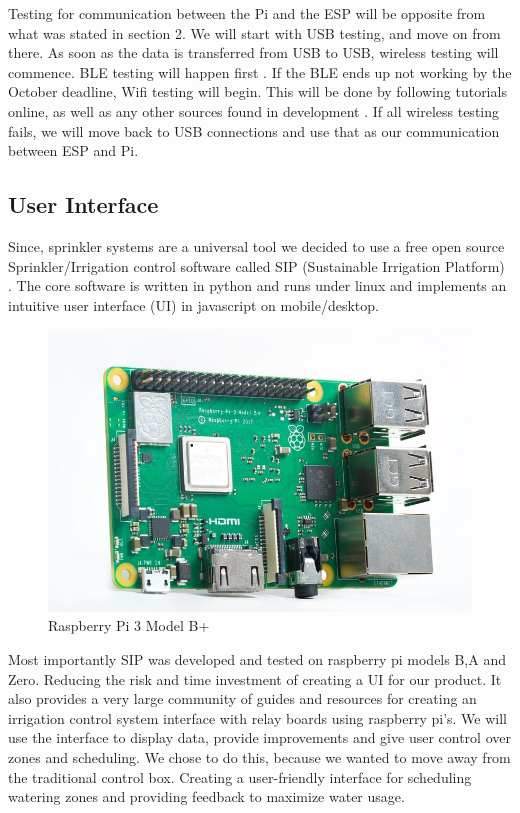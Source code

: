 \documentclass[letterpaper, 10 pt, conference]{ieeeconf}  %
\begin{document}
Testing for communication between the Pi and the ESP will be opposite from what was stated in section 2. We will start with USB testing, and move on from there. As soon as the data is transferred from USB to USB, wireless testing will commence. BLE testing will happen first \cite{micropy}. If the BLE ends up not working by the October deadline, Wifi testing will begin. This will be done by following tutorials online, as well as any other sources found in development \cite{rasServer} . If all wireless testing fails, we will move back to USB connections and use that as our communication between ESP and Pi. 

\subsection{User Interface}
Since, sprinkler systems are a universal tool we decided to use a free open source Sprinkler/Irrigation control software called SIP (Sustainable Irrigation Platform) \cite{SIP}. The core software is written in python and runs under linux and implements an intuitive user interface (UI) in javascript on mobile/desktop. 

\begin{figure}
    \centering
    \includegraphics[scale=.3]{RaspberryPIB.jpg}
    \caption{Raspberry Pi 3 Model B+}
    \label{fig:pi_label}
\end{figure}

Most importantly SIP was developed and tested on raspberry pi models B,A and Zero. Reducing the risk and time investment of creating a UI for our product. It also provides a very large community of guides and resources for creating an irrigation control system interface with relay boards using raspberry pi's. We will use the interface to display data, provide improvements and give user control over zones and scheduling. We chose to do this, because we wanted to move away from the traditional control box. Creating a user-friendly interface for scheduling watering zones and providing feedback to maximize water usage.
\end{document}
